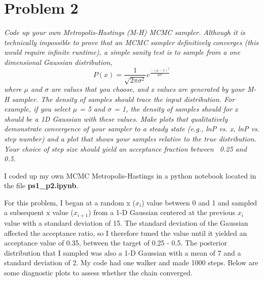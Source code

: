 \documentclass[english,12pt]{article}
\begin{document}
\section*{Problem 2}
\textit{Code up your own Metropolis-Hastings (M-H) MCMC sampler. Although it is technically impossible to prove that an MCMC sampler definitively converges (this would require infinite runtime), a simple sanity test is to sample from a one dimensional Gaussian distribution,}
\begin{equation}
P(x)= \frac{1}{\sqrt{2 \pi \sigma^2}}e^{\frac{-(\mu - x)^2}{2 \sigma^2}}
\end{equation}
\textit{where $\mu$ and $\sigma$ are values that you choose, and x values are generated by your M-H sampler. The density of samples should trace the input distribution. For example, if you select $\mu$ = 5 and $\sigma$ = 1, the density of samples should for x should be a 1D Gaussian with these values. Make plots that qualitatively demonstrate convergence of your sampler to a steady state (e.g., lnP vs. x, lnP vs. step number) and a plot that shows your samples relative to the true distribution. Your choice of step size should yield an acceptance fraction between ~0.25 and 0.5.}

I coded up my own MCMC Metropolis-Hastings in a python notebook located in the file \textbf{ps1\_p2.ipynb}.

For this problem, I began at a random x ($x_i$)  value between 0 and 1 and sampled a subsequent x value ($x_{i+1}$) from a 1-D Gaussian centered at the previous $ x_i$ value with a standard deviation of 15. The standard deviation of the Gaussian affected the acceptance ratio, so I therefore tuned the value until it yielded an acceptance value of 0.35, between the target of 0.25 - 0.5. The posterior distribution that I sampled was also a 1-D Gaussian with a mean of 7 and a standard deviation of 2. My code had one walker and made 1000 steps.
Below are some diagnostic plots to assess whether the chain converged.
\end{document}

